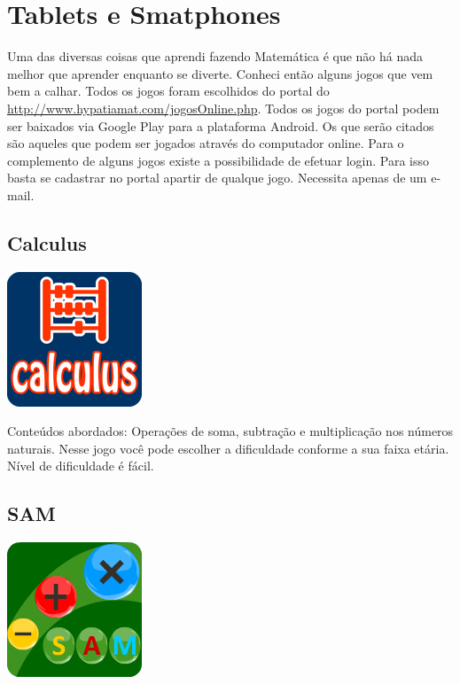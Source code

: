\section{Tablets e Smatphones}
\begin{multicols}{2}
Uma das diversas coisas que aprendi fazendo Matemática é que não há nada melhor que aprender enquanto se diverte. Conheci então alguns jogos que vem bem a calhar. Todos os jogos foram escolhidos do portal do \url{http://www.hypatiamat.com/jogosOnline.php}.
Todos os jogos do portal podem ser baixados via Google Play para a plataforma Android. Os que serão citados são aqueles que podem ser jogados através do computador online. Para o complemento de alguns jogos existe a possibilidade de efetuar login. Para isso basta se cadastrar no portal apartir de qualque jogo. Necessita apenas de um e-mail.


\subsection{Calculus}


\begin{center}
\includegraphics[scale=1]{./imagens/20.png}
\end{center}

Conteúdos abordados: Operações de soma, subtração e multiplicação nos números naturais.
Nesse jogo você pode escolher a dificuldade conforme a sua faixa etária. Nível de dificuldade é fácil.

\subsection{SAM}

\begin{center}
\includegraphics[scale=1]{./imagens/21.png}
\end{center}


\end{multicols}
